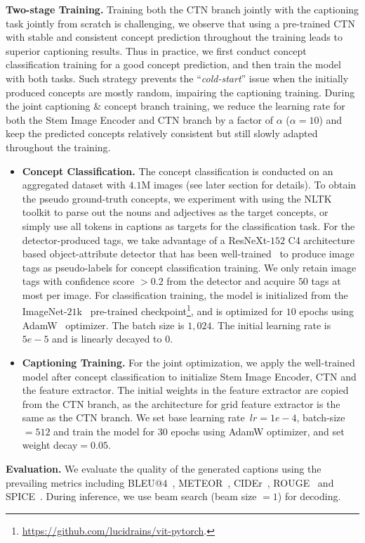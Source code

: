 \vspace{1mm}
\noindent \textbf{Two-stage Training.}
Training both the CTN branch jointly with the captioning task jointly from scratch is challenging, we observe that using a pre-trained CTN with stable and consistent concept prediction throughout the training leads to superior captioning results. Thus in practice, we first conduct concept classification training for a good concept prediction, and then train the model with both tasks. 
Such strategy prevents the ``\textit{cold-start}'' issue when the initially produced concepts are mostly random, impairing the captioning training. During the joint captioning \& concept branch training, we reduce the learning rate for both the Stem Image Encoder and CTN branch by a factor of $\alpha$ ($\alpha = 10$) and keep the predicted concepts relatively consistent but still slowly adapted throughout the training. 
\vspace{-2mm}
\begin{itemize} [leftmargin=8pt]
    \item \textbf{Concept Classification.} The concept classification is conducted on an aggregated dataset with $4.1$M images (see later section for details). To obtain the pseudo ground-truth concepts, we experiment with using the NLTK~\citep{loper2002nltk} toolkit to parse out the nouns and adjectives as the target concepts, or simply use all tokens in captions as targets for the classification task. For the detector-produced tags, we take advantage of a ResNeXt-$152$ C4 architecture based object-attribute detector that has been well-trained~\citep{zhang2021multi} to produce image tags as pseudo-labels for concept classification training. We only retain image tags with confidence score $> 0.2$ from the detector and acquire $50$ tags at most per image. For classification training, the model is initialized from the ImageNet-$21$k~\citep{krizhevsky2012imagenet} pre-trained checkpoint\footnote{\url{https://github.com/lucidrains/vit-pytorch}.}, and is optimized for $10$ epochs using AdamW~\citep{you2019large,reddi2019convergence} optimizer. The batch size is $1,024$. The initial learning rate is $5e-5$ and is linearly decayed to $0$. 
    \vspace{-2mm}
    \item  \textbf{Captioning Training.} For the joint optimization, we apply the well-trained model after concept classification to initialize Stem Image Encoder, CTN and the feature extractor. The initial weights in the feature extractor are copied from the CTN branch, as the architecture for grid feature extractor is the same as the CTN branch. We set base learning rate~$lr=1e-4$, batch-size $=512$ and train the model for $30$ epochs using AdamW optimizer, and set weight decay$=0.05$. 
\end{itemize}
\noindent \textbf{Evaluation.} We evaluate the quality of the generated captions using the prevailing metrics including BLEU@$4$~\citep{papineni2002bleu}, METEOR~\citep{banerjee2005meteor}, CIDEr~\citep{vedantam2015cider}, ROUGE~\citep{lin2004rouge} and SPICE~\citep{anderson2016spice}. During inference, we use beam search (beam size $= 1$) for decoding.


